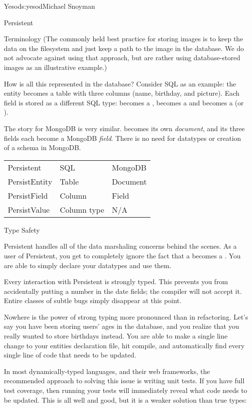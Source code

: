 \begin{aosachapter}{Yesod}{s:yesod}{Michael Snoyman}
\begin{aosasect1}{Persistent}
\begin{aosasect2}{Terminology}
(The commonly held best practice for storing images is to keep the data
on the filesystem and just keep a path to the image in the
database. We do not advocate against using that approach, but are
rather using database-stored images as an illustrative example.)

How is all this represented in the database? Consider SQL as an
example: the  entity becomes a table with three columns
(name, birthday, and picture). Each field is stored as a different SQL
type:  becomes a ,  becomes a
 and  becomes a  (or ).

The story for MongoDB is very similar.  becomes its own
\emph{document}, and its three fields each become a MongoDB
\emph{field}. There is no need for datatypes or creation of a schema
in MongoDB.

\begin{tabular}{lll}
Persistent & SQL & MongoDB \\
PersistEntity & Table & Document \\
PersistField & Column & Field \\
PersistValue & Column type & N/A \\
\end{tabular}
 
\end{aosasect2}

\begin{aosasect2}{Type Safety}

Persistent handles all of the data marshaling concerns behind the
scenes. As a user of Persistent, you get to completely ignore the fact
that a  becomes a . You are able to simply
declare your datatypes and use them.

Every interaction with Persistent is strongly typed. This prevents you
from accidentally putting a number in the date fields; the compiler
will not accept it. Entire classes of subtle bugs simply disappear at
this point.

Nowhere is the power of strong typing more pronounced than in
refactoring. Let's say you have been storing users' ages in the
database, and you realize that you really wanted to store birthdays
instead. You are able to make a single line change to your entities
declaration file, hit compile, and automatically find every single
line of code that needs to be updated.

In most dynamically-typed languages, and their web frameworks, the
recommended approach to solving this issue is writing unit tests. If
you have full test coverage, then running your tests will immediately
reveal what code needs to be updated. This is all well and good, but
it is a weaker solution than true types:


\end{aosasect2}
\end{aosasect1}
\end{aosachapter}
